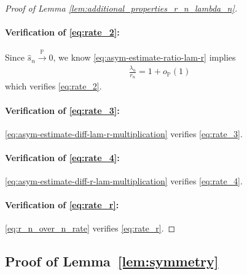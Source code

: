 \documentclass[12pt]{article}
\theoremstyle{definition}
\def\P{\mathbb{P}}
\def\P{\mathbb{P}}
\renewcommand{\P}{\mathbb{P}}							%
\newcommand{\convp}{\overset{\mathbb{P}}{\rightarrow}}             %
\begin{document}
\begin{proof}[Proof of Lemma \ref{lem:additional_properties_r_n_lambda_n}]
	\paragraph{Verification of \eqref{eq:rate_2}:} 
	
	Since $\hat s_n\convp 0$, we know \eqref{eq:asym-estimate-ratio-lam-r} implies 
	\begin{align*}
		\frac{\lambda_n}{r_n}=1+o_{\P}(1)
	\end{align*}
	which verifies \eqref{eq:rate_2}. 

	\paragraph{Verification of \eqref{eq:rate_3}:}

	\eqref{eq:asym-estimate-diff-lam-r-multiplication} verifies \eqref{eq:rate_3}.

	\paragraph{Verification of \eqref{eq:rate_4}:}

	\eqref{eq:asym-estimate-diff-r-lam-multiplication} verifies \eqref{eq:rate_4}.

	\paragraph{Verification of \eqref{eq:rate_r}:}

	\eqref{eq:r_n_over_n_rate} verifies \eqref{eq:rate_r}.	



\end{proof}



\subsection{Proof of Lemma~\ref{lem:symmetry}}
\end{document}

